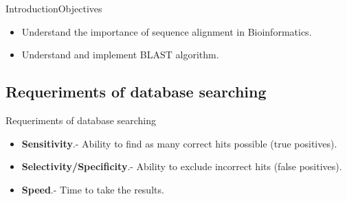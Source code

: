 \documentclass[10pt]{beamer}
\newcommand{\1}{
	\setbeamertemplate{background}{
		\texttt{[image: img/1]}
		\tikz[overlay] \fill[fill opacity=0.75,fill=white] (0,0) rectangle (-\paperwidth,\paperheight);
	}
}
\begin{document}
\begin{frame}{Introduction}{Objectives}
\begin{itemize}
    \item<1-> Understand the importance of sequence alignment in Bioinformatics. 
    \item<2-> Understand and implement BLAST algorithm.
  \end{itemize}
\end{frame}


\subsection{Requeriments of database searching}

\begin{frame}{Requeriments of database searching}
	\begin{block}{}
		\begin{itemize}
			\item \textbf{Sensitivity}.- Ability to find as many correct hits possible (true positives).
			\item \textbf{Selectivity/Specificity}.- Ability to exclude incorrect hits (false positives).
			\item \textbf{Speed}.- Time to take the results.
		\end{itemize}
			
	\end{block}
\end{frame}




\end{document}
